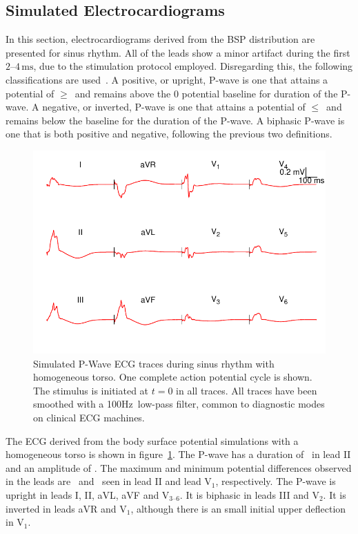 \subsection{Simulated Electrocardiograms}

In this section, electrocardiograms derived from the BSP distribution are
presented for sinus rhythm.
All of the leads show a minor artifact during the first
$2\text{--}4\,\text{ms}$, due to the stimulation protocol employed.
Disregarding this, the following classifications are used~\cite{kistler2006}.
A positive, or upright, P-wave is one that attains a potential of
$\geq$\ and remains above the 0 potential baseline for duration of the
P-wave.
A negative, or inverted, P-wave is one that attains a potential of
$\leq$\ and remains below the baseline for the duration of the P-wave.
A biphasic P-wave is one that is both positive and negative, following the
previous two definitions.


\begin{figure}
\includegraphics{figures/bsp/ecg_torso}
\caption[12 lead P-wave ECG during sinus rhythm with homogeneous torso]{
\label{bsp:fig:ecg_thorax}
Simulated P-Wave ECG traces during sinus rhythm with homogeneous torso.
One complete action potential cycle is shown.
The stimulus is initiated at $t = 0$ in all traces.
All traces have been smoothed with a \unit{100}{Hz}\ low-pass filter, common to
diagnostic modes on clinical ECG machines.
}
\end{figure}

The ECG derived from the body surface potential simulations with a homogeneous
torso is shown in figure~\ref{bsp:fig:ecg_thorax}.
The P-wave has a duration of \ in lead II and an amplitude of .
The maximum and minimum potential differences observed in the leads are
\ and \ seen in lead II and lead $\text{V}_{1}$, respectively.
The P-wave is upright in leads I, II, aVL, aVF and $\text{V}_{\text{3--6}}$.
It is biphasic in leads III and $\text{V}_{\text{2}}$.
It is inverted in leads aVR and $\text{V}_{\text{1}}$, although there is an small
initial upper deflection in $\text{V}_{\text{1}}$.

